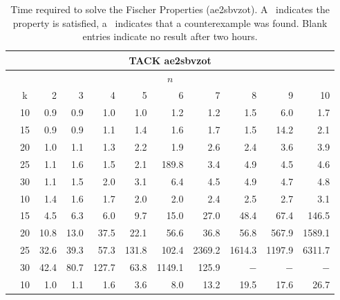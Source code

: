 \documentclass[a4paper,11pt]{report}
\newcommand*\cmark{\small\Checkmark}
\newcommand*{\xmark}{\small\XSolidBrush}
\theoremstyle{definition}
\newcommand{\aez}{ae2sbvzot}
\begin{document}
\begin{table}
\footnotesize
{}
\centering
\caption[Time required to solve the Fischer Properties (\aez)]{Time required to solve the Fischer Properties (\aez). A \cmark\
  indicates the property is satisfied, a \xmark\ indicates that a counterexample
  was found. Blank entries indicate no result after two hours.}
\label{table:fischer-results-aez}
\begin{tabular}{c|c|r r r r r r r r r}
\toprule
\multicolumn{11}{c}{TACK ae2sbvzot} \\
\midrule
\multicolumn{11}{c}{\(n\)} \\
\midrule
& k & 2 & 3 & 4 & 5 & 6 & 7 & 8 & 9 & 10 \\
\midrule
\multirow{5}{1em}{\rotatebox{90}{\textbf{live-one}}}
& 10 & 0.9\cmark & 0.9\cmark & 1.0\cmark & 1.0\cmark & 1.2\cmark & 1.2\cmark & 1.5\cmark & 6.0\cmark & 1.7\cmark \\
& 15 & 0.9\cmark & 0.9\cmark & 1.1\cmark & 1.4\cmark & 1.6\cmark & 1.7\cmark & 1.5\cmark & 14.2\cmark & 2.1\cmark \\
& 20 & 1.0\cmark & 1.1\cmark & 1.3\cmark & 2.2\cmark & 1.9\cmark & 2.6\cmark & 2.4\cmark & 3.6\cmark & 3.9\cmark \\
& 25 & 1.1\cmark & 1.6\cmark & 1.5\cmark & 2.1\cmark & 189.8\cmark & 3.4\cmark & 4.9\cmark & 4.5\cmark & 4.6\cmark \\
& 30 & 1.1\cmark & 1.5\cmark & 2.0\cmark & 3.1\cmark & 6.4\cmark & 4.5\cmark & 4.9\cmark & 4.7\cmark & 4.8\cmark \\
\midrule
\multirow{5}{1em}{\rotatebox{90}{\textbf{live-two}}}
& 10 & 1.4\cmark & 1.6\cmark & 1.7\cmark & 2.0\cmark & 2.0\cmark & 2.4\cmark & 2.5\cmark & 2.7\cmark & 3.1\cmark \\
& 15 & 4.5\cmark & 6.3\cmark & 6.0\cmark & 9.7\cmark & 15.0\cmark & 27.0\cmark & 48.4\cmark & 67.4\cmark & 146.5\cmark \\
& 20 & 10.8\cmark & 13.0\cmark & 37.5\cmark & 22.1\cmark & 56.6\cmark & 36.8\cmark & 56.8\cmark & 567.9\cmark & 1589.1\cmark \\
& 25 & 32.6\cmark & 39.3\cmark & 57.3\cmark & 131.8\cmark & 102.4\cmark & 2369.2\cmark & 1614.3\cmark & 1197.9\cmark & 6311.7\cmark \\
& 30 & 42.4\cmark & 80.7\cmark & 127.7\cmark & 63.8\cmark & 1149.1\cmark & 125.9\cmark & $-$ & $-$ & $-$ \\
\midrule
\multirow{5}{1em}{\rotatebox{90}{\textbf{live-three}}}
& 10 & 1.0\xmark & 1.1\xmark & 1.6\xmark & 3.6\xmark & 8.0\xmark & 13.2\cmark & 19.5\cmark & 17.6\cmark & 26.7\cmark \\

\end{tabular}
\end{table}
\end{document}
